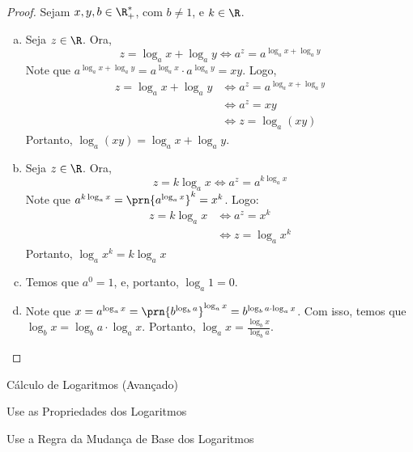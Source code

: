 \begin{proof}
    Sejam $x, y, b \in \R_+^*$, com $b \neq 1$, e $k \in \R$.
    \begin{enumerate}[(a)]
        \item 
        Seja $z \in \R$. Ora,
        \[
            z = \log_a x + \log_a y \iff a^z = a^{\log_a x + \log_a y} 
        \]
        Note que $a^{\log_a x + \log_a y}  = a^{\log_a x} \cdot a^{\log_a y} = xy$.
        Logo, 
        \begin{align*}
            z = \log_a x + \log_a y & \iff a^z = a^{\log_a x + \log_a y}\\
            & \iff a^z = xy \\
            & \iff z = \log_a(xy)
        \end{align*}
        Portanto, $\log_a(xy)=\log_a x + \log_a y$.

        \item Seja $z \in \R$.
        Ora, 
        \[
            z = k \log_a x \iff a^z = a^{k\log_a x}
        \]
        Note que $a^{k\log_a x} = \prn{a^{\log_a x}}^k = x^k$.
        Logo:
        \begin{align*}
            z = k \log_a x & \iff a^z = x^k \\ &\iff z = \log_a {x^k}
        \end{align*}
        Portanto, $\log_a{x^k}=k\log_a x$

        \item Temos que $a^0 = 1$, e, portanto, $\log_a 1 = 0$.

        \item Note que $x = a^{\log_a x} = \prn{b^{\log_b a}}^{\log_a x} = b^{\log_b a \cdot \log_a x}$.
        Com isso, temos que $\log_b x = \log_b a \cdot \log_a x$. Portanto, $\log_a x = \frac{\log_b x}{\log_b a}$.


    \end{enumerate}
\end{proof}

\begin{onlineact}
    {Cálculo de Logaritmos (Avançado)}
\end{onlineact}

\begin{onlineact}
    {Use as Propriedades dos Logaritmos}
\end{onlineact}

\begin{onlineact}
    {Use a Regra da Mudança de Base dos Logaritmos}
\end{onlineact}

